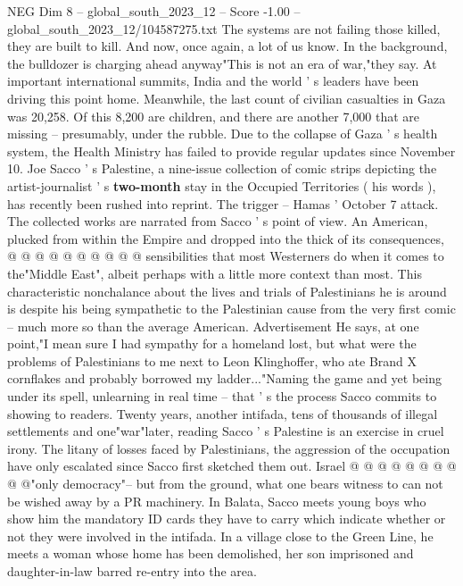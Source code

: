 \begin{textsample}{NEG Dim 8 – global\_south\_2023\_12 – Score -1.00 – global\_south\_2023\_12/104587275.txt}  \label{ex:f8_neg_224}
The systems are not failing those killed, they are built to kill.
And now, once again, a lot of us know.
In the background, the bulldozer is charging ahead anyway"This is not an era of war,"they say.
At important international summits, India and the world ' s leaders have been driving this point home.
Meanwhile, the last count of civilian casualties in Gaza was 20,258.
Of this 8,200 are children, and there are another 7,000 that are missing -- presumably, under the rubble.
Due to the collapse of Gaza ' s health system, the Health Ministry has failed to provide regular updates since November 10.
Joe Sacco ' s Palestine, a nine-issue collection of comic strips depicting the artist-journalist ' s \textbf{two-month} stay in the Occupied Territories ( his words ), has recently been rushed into reprint.
The trigger -- Hamas ' October 7 attack.
The collected works are narrated from Sacco ' s point of view.
An American, plucked from within the Empire and dropped into the thick of its consequences, @ @ @ @ @ @ @ @ @ @ sensibilities that most Westerners do when it comes to the"Middle East", albeit perhaps with a little more context than most.
This characteristic nonchalance about the lives and trials of Palestinians he is around is despite his being sympathetic to the Palestinian cause from the very first comic -- much more so than the average American.
Advertisement He says, at one point,"I mean sure I had sympathy for a homeland lost, but what were the problems of Palestinians to me next to Leon Klinghoffer, who ate Brand X cornflakes and probably borrowed my ladder..."Naming the game and yet being under its spell, unlearning in real time -- that ' s the process Sacco commits to showing to readers.
Twenty years, another intifada, tens of thousands of illegal settlements and one"war"later, reading Sacco ' s Palestine is an exercise in cruel irony.
The litany of losses faced by Palestinians, the aggression of the occupation have only escalated since Sacco first sketched them out.
Israel @ @ @ @ @ @ @ @ @ @"only democracy"-- but from the ground, what one bears witness to can not be wished away by a PR machinery.
In Balata, Sacco meets young boys who show him the mandatory ID cards they have to carry which indicate whether or not they were involved in the intifada.
In a village close to the Green Line, he meets a woman whose home has been demolished, her son imprisoned and daughter-in-law barred re-entry into the area.

\end{textsample}
